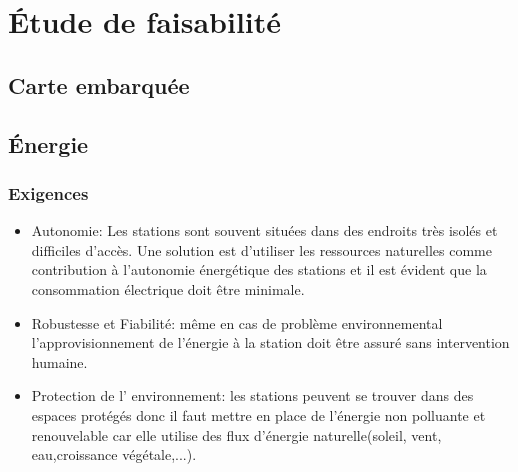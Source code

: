 \section{Étude de faisabilité}

\subsection{Carte embarquée}

\subsection{Énergie}

\subsubsection{Exigences}
\begin{itemize}

\item Autonomie: Les stations sont souvent situées dans des endroits très isolés et difficiles d'accès. Une solution est d'utiliser les ressources naturelles comme contribution à l'autonomie énergétique des stations et il est évident que la consommation électrique doit être minimale.

\smallskip \item Robustesse et Fiabilité: même en cas de problème environnemental l'approvisionnement de l'énergie à la station doit être assuré sans intervention humaine.

\smallskip \item Protection de l' environnement: les stations peuvent se trouver dans des espaces prot\'{e}g\'{e}s donc il faut mettre en place de l'\'{e}nergie non polluante et renouvelable car elle utilise des flux d'\'{e}nergie naturelle(soleil, vent, eau,croissance v\'{e}g\'{e}tale,...).
\end{itemize}

